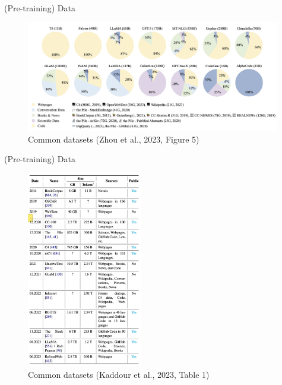 \documentclass[10pt]{beamer}
\begin{document}
\begin{frame}{(Pre-training) Data}

\begin{figure}[h]
\centering
\includegraphics[width=0.99\textwidth]{fig/zhou_2023_fig5}
\caption{Common datasets (Zhou et al., 2023, Figure 5)}
\end{figure}


\end{frame}

\begin{frame}{(Pre-training) Data}

\begin{figure}[h]
\centering
\includegraphics[width=0.45\textwidth]{fig/kaddour_2023_tab1}
\caption{Common datasets (Kaddour et al., 2023, Table 1)}
\end{figure}

\end{frame}
\end{document}
